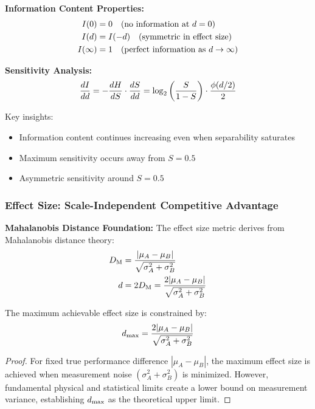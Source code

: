 \textbf{Information Content Properties:}
\begin{align}
I(0) &= 0 \quad \text{(no information at } d = 0\text{)} \\
I(d) &= I(-d) \quad \text{(symmetric in effect size)} \\
I(\infty) &= 1 \quad \text{(perfect information as } d \to \infty\text{)}
\end{align}

\textbf{Sensitivity Analysis:}
\begin{equation}
\frac{dI}{dd} = -\frac{dH}{dS} \cdot \frac{dS}{dd} = \log_2\left(\frac{S}{1-S}\right) \cdot \frac{\phi(d/2)}{2}
\end{equation}

Key insights:
\begin{itemize}
\item Information content continues increasing even when separability saturates
\item Maximum sensitivity occurs away from $S = 0.5$
\item Asymmetric sensitivity around $S = 0.5$
\end{itemize}

\subsubsection{Effect Size: Scale-Independent Competitive Advantage}

\textbf{Mahalanobis Distance Foundation:}
The effect size metric derives from Mahalanobis distance theory:
\begin{align}
D_{\text{M}} &= \frac{|\mu_A - \mu_B|}{\sqrt{\sigma_A^2 + \sigma_B^2}} \\
d &= 2D_{\text{M}} = \frac{2|\mu_A - \mu_B|}{\sqrt{\sigma_A^2 + \sigma_B^2}}
\end{align}

\begin{theorem}
\label{thm:effect_size_constraints}
The maximum achievable effect size is constrained by:
\begin{equation}
d_{\max} = \frac{2|\mu_A - \mu_B|}{\sqrt{\sigma_A^2 + \sigma_B^2}}
\end{equation}
\end{theorem}

\begin{proof}
For fixed true performance difference $|\mu_A - \mu_B|$, the maximum effect size is achieved when measurement noise $(\sigma_A^2 + \sigma_B^2)$ is minimized. However, fundamental physical and statistical limits create a lower bound on measurement variance, establishing $d_{\max}$ as the theoretical upper limit.
\end{proof}

